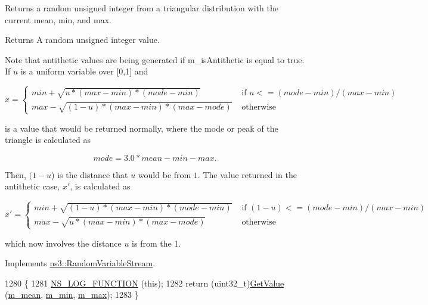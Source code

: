Returns a random unsigned integer from a triangular distribution with the current mean, min, and max. 

\begin{DoxyReturn}{Returns}
A random unsigned integer value.
\end{DoxyReturn}
Note that antithetic values are being generated if m\+\_\+is\+Antithetic is equal to true. If $u$ is a uniform variable over \mbox{[}0,1\mbox{]} and

\[ x = \left\{ \begin{array}{rl} min + \sqrt{u * (max - min) * (mode - min)} &\mbox{ if $u <= (mode - min)/(max - min)$} \\ max - \sqrt{ (1 - u) * (max - min) * (max - mode) } &\mbox{ otherwise} \end{array} \right. \]

is a value that would be returned normally, where the mode or peak of the triangle is calculated as

\[ mode = 3.0 * mean - min - max . \]

Then, $(1 - u$) is the distance that $u$ would be from $1$. The value returned in the antithetic case, $x'$, is calculated as

\[ x' = \left\{ \begin{array}{rl} min + \sqrt{(1 - u) * (max - min) * (mode - min)} &\mbox{ if $(1 - u) <= (mode - min)/(max - min)$} \\ max - \sqrt{ u * (max - min) * (max - mode) } &\mbox{ otherwise} \end{array} \right. \]

which now involves the distance $u$ is from the 1. 

Implements \hyperlink{classns3_1_1RandomVariableStream_a66cd94e6305ce7f000f1a9ff0fcb9aef}{ns3\+::\+Random\+Variable\+Stream}.


\begin{DoxyCode}
1280 \{
1281   \hyperlink{log-macros-disabled_8h_a90b90d5bad1f39cb1b64923ea94c0761}{NS\_LOG\_FUNCTION} (\textcolor{keyword}{this});
1282   \textcolor{keywordflow}{return} (uint32\_t)\hyperlink{classns3_1_1TriangularRandomVariable_a2d61dfce4b5be840c57aa1aea655e3c1}{GetValue} (\hyperlink{classns3_1_1TriangularRandomVariable_a9c1b9e0f4bf53d8277fdb76275df731a}{m\_mean}, \hyperlink{classns3_1_1TriangularRandomVariable_acd78d6af1b19000d64c22fd2aba49493}{m\_min}, \hyperlink{classns3_1_1TriangularRandomVariable_aa1a7f68942d3aefa85414784e0071244}{m\_max});
1283 \}
\end{DoxyCode}



